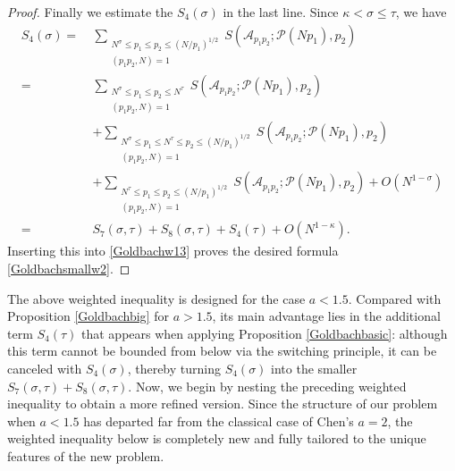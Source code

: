 \documentclass[12pt, a4paper]{amsart}
\def\le{\leqslant}
\theoremstyle{plain}
\theoremstyle{remark}
\numberwithin{equation}{section}
\begin{document}
\begin{proof}
Finally we estimate the $S_4(\sigma)$ in the last line. 
Since $\kappa<\sigma\le \tau$, we have 
		\begin{equation}\label{Goldbachw14}
		\begin{split}
		S_4(\sigma)=\ &\sum_{\substack{N^\sigma \le p_1 \le p_2 \le (N/p_1)^{1/2} \\ (p_1 p_2, N) = 1}}  S(\mathscr{A}_{p_1 p_2}; \mathscr{P}(N p_1), p_2)\\ 
		=\ &\sum_{\substack{N^\sigma \le p_1 \le p_2 \le N^\tau \\ (p_1 p_2, N) = 1}}  S(\mathscr{A}_{p_1 p_2}; \mathscr{P}(N p_1), p_2)\\
		&+\sum_{\substack{N^\sigma \le p_1 \le N^\tau\le p_2 \le (N/p_1)^{1/2} \\ (p_1 p_2, N) = 1}}  S(\mathscr{A}_{p_1 p_2}; \mathscr{P}(N p_1), p_2)\\
		&+\sum_{\substack{N^\tau \le p_1 \le p_2 \le (N/p_1)^{1/2} \\ (p_1 p_2, N) = 1}}  S(\mathscr{A}_{p_1 p_2}; \mathscr{P}(N p_1), p_2)+O(N^{1-\sigma})\\
		=\ &S_7(\sigma,\tau)+S_8(\sigma,\tau)+S_4(\tau)+O(N^{1-\kappa}). 
		\end{split}
		\end{equation}
Inserting this into \eqref{Goldbachw13} proves the desired formula \eqref{Goldbachsmallw2}. 
\end{proof}

The above weighted inequality is designed for the case $a<1.5$. Compared with Proposition \ref{Goldbachbig} for $a>1.5$, its main advantage lies in the additional term $S_4(\tau)$ that appears when applying Proposition \ref{Goldbachbasic}: although this term cannot be bounded from below via the switching principle, it can be canceled with $S_4(\sigma)$, thereby turning $S_4(\sigma)$ into the smaller $S_7(\sigma,\tau)+S_8(\sigma,\tau)$.
Now, we begin by nesting the preceding weighted inequality to obtain a more refined version. Since the structure of our problem when $a<1.5$ has departed far from the classical case of Chen's $a=2$, the weighted inequality below is completely new and fully tailored to the unique features of the new problem.
\end{document}
